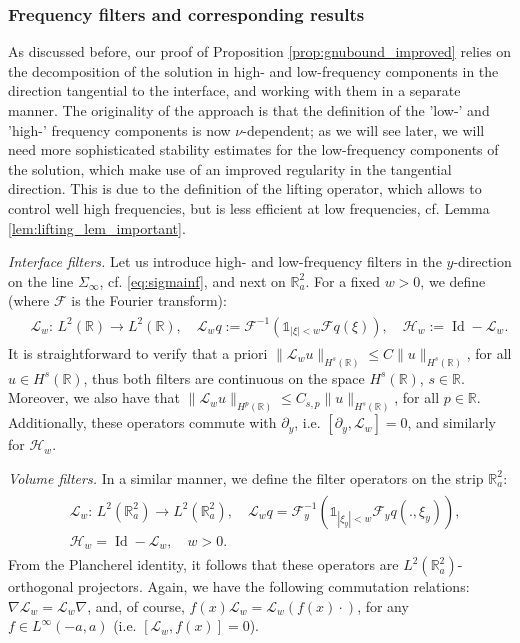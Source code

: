 \documentclass[report]{elsarticle}
\numberwithin{theorem}{section}
\begin{document}
\subsubsection{{Frequency filters and corresponding results}} 
As discussed before, our proof of Proposition \ref{prop:gnubound_improved} relies on the decomposition of the solution in high- and low-frequency components in the direction tangential to the interface, and working with them in a separate manner. The originality of the approach is that the definition of the 'low-' and 'high-' frequency components is now $\nu$-dependent; as we will see later, we will need more sophisticated stability estimates for the low-frequency components of the solution, which make use of an improved regularity in the tangential direction. This is due to the definition of the lifting operator, which allows to control well high frequencies, but is less efficient at low frequencies, cf. Lemma \ref{lem:lifting_lem_important}.

\textit{Interface filters. }Let us introduce high- and low-frequency filters in the $y$-direction on the line ${\Sigma}_{\infty}$, cf. \eqref{eq:sigmainf}, and next on $\mathbb{R}^2_a$. For a fixed $w>0$, we define  (where $\mathcal{F}$ is the Fourier transform):
\begin{align}
	\label{eq:filter_operators}
	\begin{split}
		&\mathcal{L}_{w}: \, L^2(\mathbb{R})\rightarrow L^2(\mathbb{R}), \quad \mathcal{L}_w q:=\mathcal{F}^{-1}\left(\mathbb{1}_{|\xi|<w}\mathcal{F}q(\xi)\right),\quad \mathcal{H}_w:=\operatorname{Id}-\mathcal{L}_w.
	\end{split}
\end{align}
It is straightforward to verify that a priori $\|\mathcal{L}_w u\|_{H^s(\mathbb{R})}\leq C\|u\|_{H^s(\mathbb{R})}$, for all $u\in H^s(\mathbb{R})$, thus both filters are continuous on the space $H^s(\mathbb{R})$, $s\in \mathbb{R}$. Moreover, we also have that $\|\mathcal{L}_w u\|_{H^p(\mathbb{R})}\leq C_{s,p}\|u\|_{H^s(\mathbb{R})}$, for all $p\in \mathbb{R}$. Additionally, these operators commute with $\partial_y$, i.e. $[\partial_y, \mathcal{L}_w]=0$, and similarly for $\mathcal{H}_w$. 

\textit{Volume filters. }In a similar manner, we define the filter operators on the strip $\mathbb{R}_a^{2}$:
\begin{align}
	\label{eq:filter_operatorsR2}
	\begin{split}
		&\boldsymbol{\mathcal{L}}_{w}: \, L^2(\mathbb{R}^{2}_a)\rightarrow L^2(\mathbb{R}^{2}_a), \quad \boldsymbol{\mathcal{L}}_{w} q=\mathcal{F}^{-1}_y\left(\mathbb{1}_{|\xi_y|<w}\mathcal{F}_yq(.,\xi_y)\right),\\
		&\boldsymbol{\mathcal{H}}_{w}=\operatorname{Id}-\boldsymbol{\mathcal{L}}_{w}, \quad w>0.
	\end{split}
\end{align}
From the Plancherel identity, it follows that these operators are $L^2(\mathbb{R}^2_a)$-orthogonal projectors. Again, we have the following commutation relations: $\nabla \boldsymbol{\mathcal{L}}_{w}=\boldsymbol{\mathcal{L}}_{w}\nabla$, and, of course,  $f(x) \boldsymbol{\mathcal{L}}_{w}=\boldsymbol{\mathcal{L}}_{w}(f(x)\cdot)$, for any $f\in L^{\infty}(-a,a)$ (i.e. $[\boldsymbol{\mathcal{L}}_{w}, f(x)]=0$).
\end{document}
